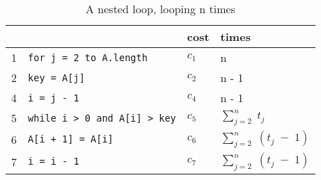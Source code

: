 \begin{center}
	\begin{table}[h]
		\centering
		\begin{tabular}{|l|l|l|l|}
			 \hline
			  &  													& \textbf{cost}	& \textbf{times}					\\ \hline
			1 & \lstinline|for j = 2 to A.length| 					& $c_1$ 		& n 								\\
			2 & \quad\quad \lstinline|key = A[j]| 					& $c_2$ 		& n - 1 							\\
			4 & \quad\quad \lstinline|i = j - 1| 					& $c_4$ 		& n - 1 							\\
			5 & \quad\quad \lstinline|while i > 0 and A[i] > key|	& $c_5$ 		&  $\sum_{j=2}^{n}\;t_j$ 			\\
			6 & \quad\quad\quad\quad \lstinline|A[i + 1] = A[i]|	& $c_6$ 		&  $\sum_{j=2}^{n}\;(t_j\;-\;1)$ 	\\
			7 & \quad\quad\quad\quad \lstinline|i = i - 1| 			& $c_7$ 		&  $\sum_{j=2}^{n}\;(t_j\;-\;1)$ 	\\ \hline
		\end{tabular}
		\caption{A nested loop, looping n times}
		\label{tab:insertionCode}
	\end{table}
\end{center}